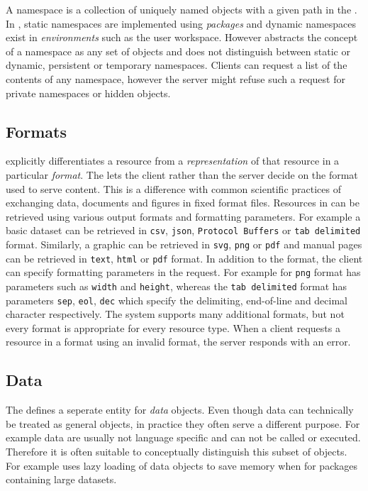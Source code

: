 A namespace is a collection of uniquely named objects with a given path in the \API. In \R, static namespaces are implemented using \emph{packages} and dynamic namespaces exist in \emph{environments} such as the user workspace. However \OpenCPU abstracts the concept of a namespace as any set of objects and does not distinguish between static or dynamic, persistent or temporary namespaces. Clients can request a list of the contents of any namespace, however the server might refuse such a request for private namespaces or hidden objects. 

\subsection{Formats}

\OpenCPU explicitly differentiates a resource from a \emph{representation} of that resource in a particular \emph{format}. The \API lets the client rather than the server decide on the format used to serve content. This is a difference with common scientific practices of exchanging data, documents and figures in fixed format files. Resources in \OpenCPU can be retrieved using various output formats and formatting parameters. For example a basic dataset can be retrieved in \texttt{csv}, \texttt{json}, \texttt{Protocol Buffers} or \texttt{tab delimited} format. Similarly, a graphic can be retrieved in \texttt{svg}, \texttt{png} or \texttt{pdf} and manual pages can be retrieved in \texttt{text}, \texttt{html} or \texttt{pdf} format. In addition to the format, the client can specify formatting parameters in the request. For example for \texttt{png} format has parameters such as \texttt{width} and \texttt{height}, whereas the \texttt{tab delimited} format has parameters \texttt{sep}, \texttt{eol}, \texttt{dec} which specify the delimiting, end-of-line and decimal character respectively. The system supports many additional formats, but not every format is appropriate for every resource type. When a client requests a resource in a format using an invalid format, the server responds with an error. 

\subsection{Data}

The \API defines a seperate entity for \emph{data} objects. Even though data can technically be treated as general objects, in practice they often serve a different purpose. For example data are usually not language specific and can not be called or executed. Therefore it is often suitable to conceptually distinguish this subset of objects. For example \R uses lazy loading of data objects to save memory when for packages containing large datasets.



